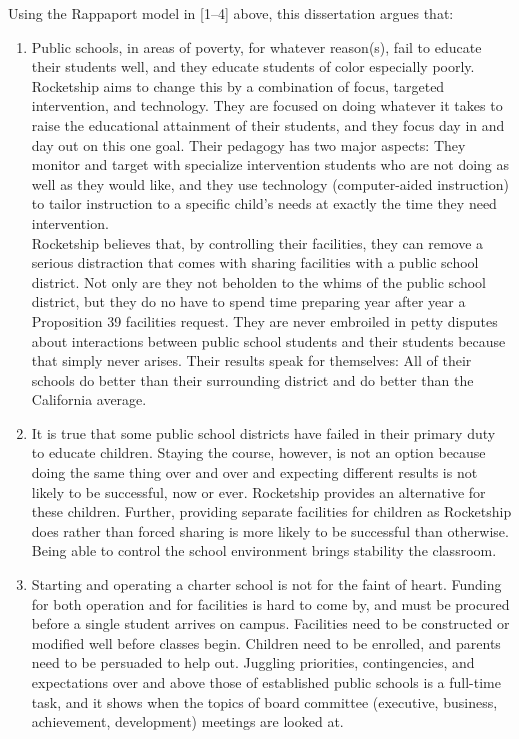 Using the Rappaport model in [1–4] above, this dissertation argues that:
\begin{enumerate}
  \item Public schools, in areas of poverty, for whatever reason(s), fail to educate their students well, and they educate students of color especially poorly. Rocketship aims to change this by a combination of focus, targeted intervention, and technology. They are focused on doing whatever it takes to raise the educational attainment of their students, and they focus day in and day out on this one goal. Their pedagogy has two major aspects: They monitor and target with specialize intervention students who are not doing as well as they would like, and they use technology (computer-aided instruction) to tailor instruction to a specific child's needs at exactly the time they need intervention.\\ %
  Rocketship believes that, by controlling their facilities, they can remove a serious distraction that comes with sharing facilities with a public school district. Not only are they not beholden to the whims of the public school district, but they do no have to spend time preparing year after year a Proposition 39 facilities request. They are never embroiled in petty disputes about interactions between public school students and their students because that simply never arises. Their results speak for themselves: All of their schools do better than their surrounding district and do better than the California average.

  \item It is true that some public school districts have failed in their primary duty to educate children. Staying the course, however, is not an option because doing the same thing over and over and expecting different results is not likely to be successful, now or ever. Rocketship provides an alternative for these children. Further, providing separate facilities for children as Rocketship does rather than forced sharing is more likely to be successful than otherwise. Being able to control the school environment brings stability the classroom.

  \item Starting and operating a charter school is not for the faint of heart. Funding for both operation and for facilities is hard to come by, and must be procured before a single student arrives on campus. Facilities need to be constructed or modified well before classes begin. Children need to be enrolled, and parents need to be persuaded to help out. Juggling priorities, contingencies, and expectations over and above those of established public schools is a full-time task, and it shows when the topics of board committee (executive, business, achievement, development) meetings are looked at.


\end{enumerate}
